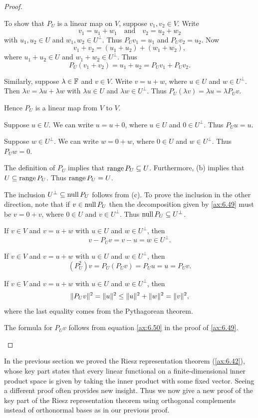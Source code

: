 \begin{proof}\leavevmode
\begin{parts}
\item To show that $P_U$ is a linear map on $V$, suppose $v_1,v_2\in V$. Write
  \[ v_1=u_1+w_1 \quad\text{and}\quad v_2=u_2+w_2 \]
  with $u_1,u_2\in U$ and $w_1,w_2\in U^\perp$. Thus $P_Uv_1=u_1$ and
  $P_Uv_2=u_2$. Now
  \[ v_1+v_2 = (u_1+u_2)+(w_1+w_2), \]
  where $u_1+u_2\in U$ and $w_1+w_2\in U^\perp$. Thus
  \[ P_U(v_1+v_2) = u_1+u_2 = P_Uv_1+P_Uv_2. \]

  Similarly, suppose $\lambda\in\mathbb{F}$ and $v\in V$. Write $v=u+w$, where $u\in U$
  and $w\in U^\perp$. Then $\lambda v=\lambda u+\lambda w$ with
  $\lambda u\in U$ and $\lambda w\in U^\perp$. Thus
  $P_U(\lambda v)=\lambda u=\lambda P_Uv$.

  Hence $P_U$ is a linear map from $V$ to $V$.
\item Suppose $u\in U$. We can write $u=u+0$, where $u\in U$ and
  $0\in U^\perp$. Thus $P_Uu=u$.
\item Suppose $w\in U^\perp$. We can write $w=0+w$, where $0\in U$ and
  $w\in U^\perp$. Thus $P_Uw=0$.
\item The definition of $P_U$ implies that $\operatorname{range} P_U\subseteq U$.
  Furthermore, (b) implies that $U\subseteq\operatorname{range} P_U$. Thus $\operatorname{range} P_U=U$.
\item The inclusion $U^\perp\subseteq\operatorname{null} P_U$ follows from (c). To prove the
  inclusion in the other direction, note that if $v\in\operatorname{null} P_U$ then the
  decomposition given by \ref{ax:6.49} must be $v=0+v$, where $0\in U$ and
  $v\in U^\perp$. Thus $\operatorname{null} P_U\subseteq U^\perp$.
\item If $v\in V$ and $v=u+w$ with $u\in U$ and $w\in U^\perp$, then
  \[ v-P_Uv = v-u = w\in U^\perp. \]
\item If $v\in V$ and $v=u+w$ with $u\in U$ and $w\in U^\perp$, then
  \[ (P_U^2)v = P_U(P_Uv) = P_Uu = u = P_Uv. \]
\item If $v\in V$ and $v=u+w$ with $u\in U$ and $w\in U^\perp$, then
  \[ \lVert P_Uv \rVert^2 = \lVert u \rVert^2 \le \lVert u \rVert^2+\lVert w \rVert^2 = \lVert v \rVert^2, \]
  where the last equality comes from the Pythagorean theorem.
\item The formula for $P_Uv$ follows from equation \ref{ax:6.50} in the proof
  of \ref{ax:6.49}. \qedhere
\end{parts}
\end{proof}

In the previous section we proved the Riesz representation theorem
(\ref{ax:6.42}), whose key part states that every linear functional on a
finite-dimensional inner product space is given by taking the inner product
with some fixed vector. Seeing a different proof often provides new insight.
Thus we now give a new proof of the key part of the Riesz representation
theorem using orthogonal complements instead of orthonormal bases as in our
previous proof.

